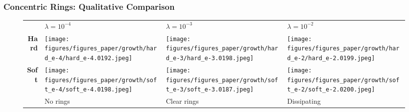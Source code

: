 \documentclass[10pt,t]{beamer}
\begin{document}
\begin{frame}
    \frametitle{Concentric Rings: Qualitative Comparison}



    \vspace{-0.3cm}
    \begin{figure}
        \centering
        \begin{tabular}{r M{0.25\textwidth} M{0.25\textwidth} M{0.25\textwidth}}
                                                                                                             & $\lambda = 10^{-4}$   & $\lambda = 10^{-3}$      & $\lambda = 10^{-2}$
            \\[3pt]
            \textbf{Hard}                                                                                    &
            \texttt{[image: figures/figures\_paper/growth/hard\_e-4/hard\_e-4.0192.jpeg]} &
            \texttt{[image: figures/figures\_paper/growth/hard\_e-3/hard\_e-3.0198.jpeg]} &
            \texttt{[image: figures/figures\_paper/growth/hard\_e-2/hard\_e-2.0199.jpeg]}                                                                               \\[3pt]

            \textbf{Soft}                                                                                    &
            \texttt{[image: figures/figures\_paper/growth/soft\_e-4/soft\_e-4.0198.jpeg]} &
            \texttt{[image: figures/figures\_paper/growth/soft\_e-3/soft\_e-3.0187.jpeg]} &
            \texttt{[image: figures/figures\_paper/growth/soft\_e-2/soft\_e-2.0200.jpeg]}                                                                               \\[3pt]

                                                                                                             & \scriptsize{No rings} & \scriptsize{Clear rings} & \scriptsize{Dissipating}
        \end{tabular}
    \end{figure}

\end{frame}
\end{document}
